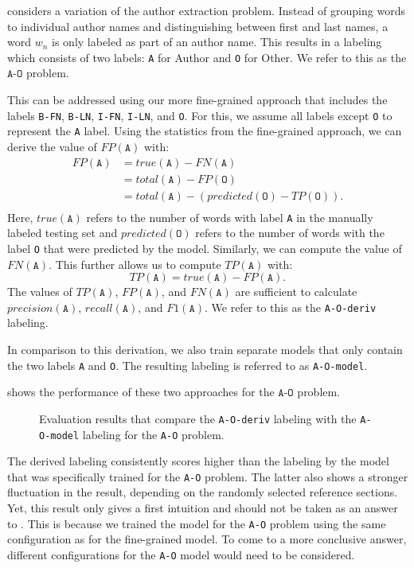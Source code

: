 \bigskip

 considers a variation of the author extraction problem.
Instead of grouping words to individual author names and distinguishing between first and last names, a word $w_n$ is only labeled as part of an author name.
This results in a labeling which consists of two labels:
\texttt{A} for Author and \texttt{O} for Other.
We refer to this as the $\texttt{A-O}$ problem.

This can be addressed using our more fine-grained approach that includes the labels \texttt{B-FN}, \texttt{B-LN}, \texttt{I-FN}, \texttt{I-LN}, and \texttt{O}.
For this, we assume all labels except \texttt{O} to represent the \texttt{A} label.
Using the statistics from the fine-grained approach, we can derive the value of $FP(\texttt{A})$ with:
\begin{equation*}
\begin{split}
  FP(\texttt{A})&=true(\texttt{A})-FN(\texttt{A})\\
  &=total(\texttt{A})-FP(\texttt{O})\\
  &=total(\texttt{A})-(predicted(\texttt{O})-TP(\texttt{O})).\\
\end{split}
\end{equation*}
Here, $true(\texttt{A})$ refers to the number of words with label \texttt{A} in the manually labeled testing set and $predicted(\texttt{O})$ refers to the number of words with the label \texttt{O} that were predicted by the model.
Similarly, we can compute the value of $FN(\texttt{A})$.
This further allows us to compute $TP(\texttt{A})$ with:
\begin{equation*}
  TP(\texttt{A})=true(\texttt{A})-FP(\texttt{A}).
\end{equation*}
The values of $TP(\texttt{A})$, $FP(\texttt{A})$, and $FN(\texttt{A})$ are sufficient to calculate $precision(\texttt{A})$, $recall(\texttt{A})$, and $F1(\texttt{A})$.
We refer to this as the \texttt{A-O-deriv} labeling.

In comparison to this derivation, we also train separate models that only contain the two labels \texttt{A} and \texttt{O}.
The resulting labeling is referred to as \texttt{A-O-model}.

 shows the performance of these two approaches for the $\texttt{A-O}$ problem.
\begin{figure}

\caption{Evaluation results that compare the \texttt{A-O-deriv} labeling with the \texttt{A-O-model} labeling for the \texttt{A-O} problem.}
\label{fig:eval-authors-only}
\end{figure}
The derived labeling consistently scores higher than the labeling by the model that was specifically trained for the \texttt{A-O} problem.
The latter also shows a stronger fluctuation in the result, depending on the randomly selected reference sections.
Yet, this result only gives a first intuition and should not be taken as an answer to .
This is because we trained the model for the \texttt{A-O} problem using the same configuration as for the fine-grained model.
To come to a more conclusive answer, different configurations for the \texttt{A-O} model would need to be considered.


